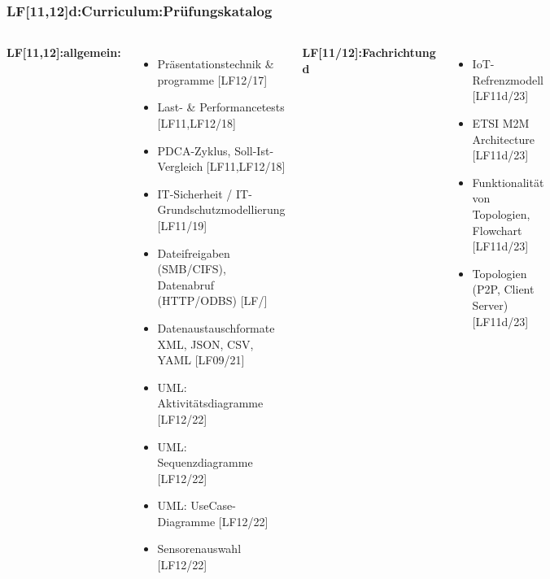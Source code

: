 

\begin{frame}
  \frametitle{LF[11,12]d:Curriculum:Prüfungskatalog}
  \begin{tiny}
  \begin{columns}[T]
    \textbf{LF[11,12]:allgemein:}
    \begin{itemize}
      \item[\faSquareO] Präsentationstechnik \& programme [LF12/17]
      \item[\faSquareO] Last- \& Performancetests [LF11,LF12/18]
      \item[\faSquareO] PDCA-Zyklus, Soll-Ist-Vergleich [LF11,LF12/18]
      \item[\faSquareO] IT-Sicherheit / IT-Grundschutzmodellierung [LF11/19]
      \item[\faSquareO] Dateifreigaben (SMB/CIFS), Datenabruf (HTTP/ODBS)  [LF/]
      \item[\faSquareO] Datenaustauschformate XML, JSON, CSV, YAML [LF09/21]
      \item[\faSquareO] UML: Aktivitätsdiagramme [LF12/22]
      \item[\faSquareO] UML: Sequenzdiagramme [LF12/22]
      \item[\faSquareO] UML: UseCase-Diagramme [LF12/22]
      \item[\faSquareO] Sensorenauswahl [LF12/22]
    \end{itemize}
    \textbf{LF[11/12]:Fachrichtung d}
    \begin{itemize}
      \item[\faSquareO] IoT-Refrenzmodell [LF11d/23]
      \item[\faSquareO] ETSI M2M Architecture  [LF11d/23]
      \item[\faSquareO] Funktionalität von Topologien, Flowchart [LF11d/23]
      \item[\faSquareO] Topologien (P2P, Client Server) [LF11d/23]

\end{itemize}
\end{columns}
\end{tiny}
\end{frame}
